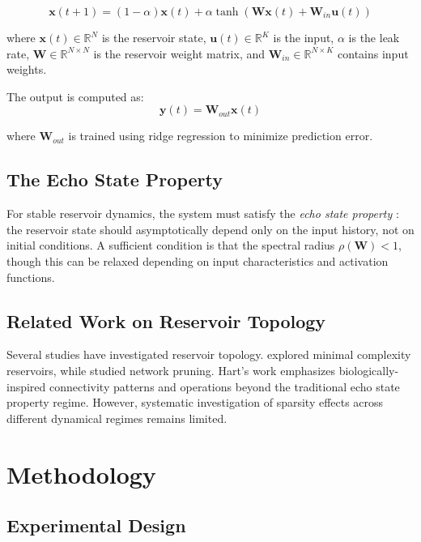 \documentclass[11pt,a4paper]{article}
\begin{document}
\begin{equation}
\mathbf{x}(t+1) = (1-\alpha)\mathbf{x}(t) + \alpha \tanh(\mathbf{W}\mathbf{x}(t) + \mathbf{W}_{in}\mathbf{u}(t))
\end{equation}

where $\mathbf{x}(t) \in \mathbb{R}^N$ is the reservoir state, $\mathbf{u}(t) \in \mathbb{R}^K$ is the input, $\alpha$ is the leak rate, $\mathbf{W} \in \mathbb{R}^{N \times N}$ is the reservoir weight matrix, and $\mathbf{W}_{in} \in \mathbb{R}^{N \times K}$ contains input weights.

The output is computed as:
\begin{equation}
\mathbf{y}(t) = \mathbf{W}_{out}\mathbf{x}(t)
\end{equation}

where $\mathbf{W}_{out}$ is trained using ridge regression to minimize prediction error.

\subsection{The Echo State Property}

For stable reservoir dynamics, the system must satisfy the \emph{echo state property} \citep{jaeger2001echo}: the reservoir state should asymptotically depend only on the input history, not on initial conditions. A sufficient condition is that the spectral radius $\rho(\mathbf{W}) < 1$, though this can be relaxed depending on input characteristics and activation functions.

\subsection{Related Work on Reservoir Topology}

Several studies have investigated reservoir topology. \citet{rodan2010minimum} explored minimal complexity reservoirs, while \citet{dutoit2009pruning} studied network pruning. Hart's work \citep{hart2022brain} emphasizes biologically-inspired connectivity patterns and operations beyond the traditional echo state property regime. However, systematic investigation of sparsity effects across different dynamical regimes remains limited.

\section{Methodology}

\subsection{Experimental Design}
\end{document}
